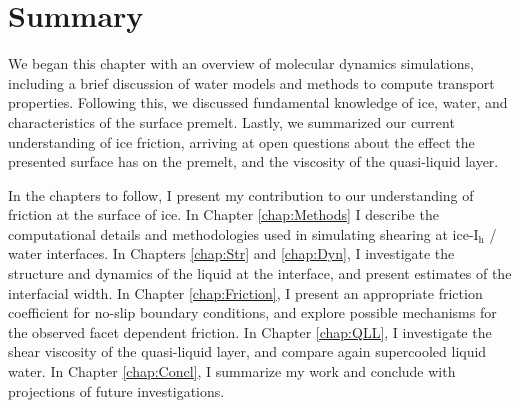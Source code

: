 



\section{Summary}
We began this chapter with an overview of molecular dynamics
simulations, including a brief discussion of water models and methods
to compute transport properties. Following this, we discussed
fundamental knowledge of ice, water, and characteristics of the
surface premelt. Lastly, we summarized our current
understanding of ice friction, arriving at open questions about the
effect the presented surface has on the premelt, and the
viscosity of the quasi-liquid layer.

In the chapters to follow, I present my contribution to our
understanding of friction at the surface of ice. In Chapter
\ref{chap:Methods} I describe the computational details and
methodologies used in simulating shearing at ice-I$_\mathrm{h}$ /
water interfaces. In Chapters \ref{chap:Str} and \ref{chap:Dyn}, I
investigate the structure and dynamics of the liquid at the interface,
and present estimates of the interfacial width. In Chapter
\ref{chap:Friction}, I present an appropriate friction coefficient for
no-slip boundary conditions, and explore possible mechanisms for the
observed facet dependent friction. In Chapter \ref{chap:QLL}, I
investigate the shear viscosity of the quasi-liquid layer, and compare
again supercooled liquid water. In Chapter \ref{chap:Concl}, I
summarize my work and conclude with projections of future
investigations.

